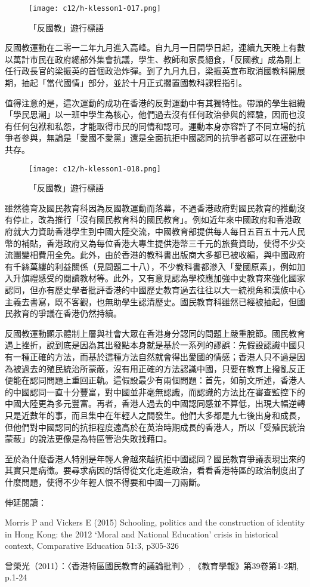 \begin{figure}[htbp]
    \centering
    \texttt{[image: c12/h-klesson1-017.png]}
    \caption{「反國教」遊行標語} 
\end{figure}

反國教運動在二零一二年九月進入高峰。自九月一日開學日起，連續九天晚上有數以萬計市民在政府總部外集會抗議，學生、教師和家長絕食，「反國教」成為剛上任行政長官的梁振英的首個政治炸彈。到了九月九日，梁振英宣布取消國教科開展期，抽起「當代國情」部分，並於十月正式擱置國教科課程指引。

值得注意的是，這次運動的成功在香港的反對運動中有其獨特性。帶頭的學生組織「學民思潮」以一班中學生為核心，他們過去沒有任何政治參與的經驗，因而也沒有任何包袱和私怨，才能取得市民的同情和認可。運動本身亦容許了不同立場的抗爭者參與，無論是「愛國不愛黨」還是全面抗拒中國認同的抗爭者都可以在運動中共存。

\begin{figure}[htbp]
    \centering
    \texttt{[image: c12/h-klesson1-018.png]}
    \caption{「反國教」遊行標語} 
\end{figure}

雖然德育及國民教育科因為反國教運動而落幕，不過香港政府對國民教育的推動沒有停止，改為推行「沒有國民教育科的國民教育」。例如近年來中國政府和香港政府就大力資助香港學生到中國大陸交流，中國教育部提供每人每日五百五十元人民幣的補貼，香港政府又為每位香港大專生提供港幣三千元的旅費資助，使得不少交流團變相費用全免。此外，由於香港的教科書出版商大多都已被收編，與中國政府有千絲萬縷的利益關係（見問題二十八），不少教科書都滲入「愛國原素」，例如加入升旗禮感受的閱讀教材等。此外，又有意見認為學校應加強中史教育來強化國家認同，但亦有歷史學者批評香港的中國歷史教育過去往往以大一統視角和漢族中心主義去書寫，既不客觀，也無助學生認清歷史。國民教育科雖然已經被抽起，但國民教育的爭議在香港仍然持續。

反國教運動顯示體制上層與社會大眾在香港身分認同的問題上嚴重脫節。國民教育遇上挫折，說到底是因為其出發點本身就是基於一系列的謬誤：先假設認識中國只有一種正確的方法，而基於這種方法自然就會得出愛國的情感；香港人只不過是因為被過去的殖民統治所蒙蔽，沒有用正確的方法認識中國，只要在教育上撥亂反正便能在認同問題上重回正軌。這假設最少有兩個問題：首先，如前文所述，香港人的中國認同一直十分豐富，對中國並非毫無認識，而認識的方法比在審查監控下的中國大陸更為多元豐富。再者，香港人過去的中國認同感並不算低，出現大幅逆轉只是近數年的事，而且集中在年輕人之間發生。他們大多都是九七後出身和成長，但他們對中國認同的抗拒程度遠高於在英治時期成長的香港人，所以「受殖民統治蒙蔽」的說法更像是為特區管治失敗找藉口。

至於為什麼香港人特別是年輕人會越來越抗拒中國認同？國民教育爭議表現出來的其實只是病徵。要尋求病因的話得從文化走進政治，看看香港特區的政治制度出了什麼問題，使得不少年輕人恨不得要和中國一刀兩斷。


伸延閱讀：

Morris P and Vickers E (2015) Schooling, politics and the construction of identity in Hong Kong: the 2012 ‘Moral and National Education’ crisis in historical context, Comparative Education 51:3, p305-326

曾榮光（2011）：〈香港特區國民教育的議論批判〉, 《教育學報》第39卷第1-2期, p.1-24